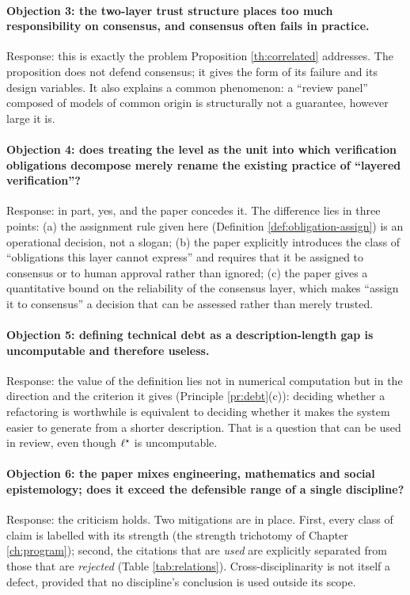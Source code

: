 \paragraph{Objection 3: the two-layer trust structure places too much responsibility on
consensus, and consensus often fails in practice.}
Response: this is exactly the problem Proposition \ref{th:correlated} addresses. The
proposition does not defend consensus; it gives the form of its failure and its design
variables. It also explains a common phenomenon: a ``review panel'' composed of models of
common origin is structurally not a guarantee, however large it is.

\paragraph{Objection 4: does treating the level as the unit into which verification
obligations decompose merely rename the existing practice of ``layered verification''?}
Response: in part, yes, and the paper concedes it. The difference lies in three points:
(a) the assignment rule given here (Definition \ref{def:obligation-assign}) is an
operational decision, not a slogan; (b) the paper explicitly introduces the class of
``obligations this layer cannot express'' and requires that it be assigned to consensus or
to human approval rather than ignored; (c) the paper gives a quantitative bound on the
reliability of the consensus layer, which makes ``assign it to consensus'' a decision that
can be assessed rather than merely trusted.

\paragraph{Objection 5: defining technical debt as a description-length gap is
uncomputable and therefore useless.}
Response: the value of the definition lies not in numerical computation but in the
direction and the criterion it gives (Principle \ref{pr:debt}(c)): deciding whether a
refactoring is worthwhile is equivalent to deciding whether it makes the system easier to
generate from a shorter description. That is a question that can be used in review, even
though $\ell^{\star}$ is uncomputable.

\paragraph{Objection 6: the paper mixes engineering, mathematics and social epistemology;
does it exceed the defensible range of a single discipline?}
Response: the criticism holds. Two mitigations are in place. First, every class of claim is
labelled with its strength (the strength trichotomy of Chapter \ref{ch:program}); second,
the citations that are \emph{used} are explicitly separated from those that are
\emph{rejected} (Table \ref{tab:relations}). Cross-disciplinarity is not itself a defect,
provided that no discipline's conclusion is used outside its scope.

